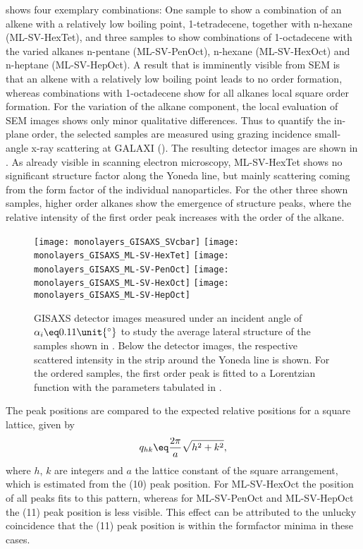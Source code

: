 \documentclass[\main/dresen_thesis.tex]{subfiles}
\begin{document}
   shows four exemplary combinations: One sample to show a combination of an alkene with a relatively low boiling point, 1-tetradecene, together with n-hexane (ML-SV-HexTet), and three samples to show combinations of 1-octadecene with the varied alkanes n-pentane (ML-SV-PenOct), n-hexane (ML-SV-HexOct) and n-heptane (ML-SV-HepOct).
  A result that is imminently visible from SEM is that an alkene with a relatively low boiling point leads to no order formation, whereas  combinations with 1-octadecene show for all alkanes local square order formation.
  For the variation of the alkane component, the local evaluation of SEM images shows only minor qualitative differences.
  Thus to quantify the in-plane order, the selected samples are measured using grazing incidence small-angle x-ray scattering at GALAXI ().
  The resulting detector images are shown in .
  As already visible in scanning electron microscopy, ML-SV-HexTet shows no significant structure factor along the Yoneda line, but mainly scattering coming from the form factor of the individual nanoparticles.
  For the other three shown samples, higher order alkanes show the emergence of structure peaks, where the relative intensity of the first order peak increases with the order of the alkane.

  \begin{figure}[tb]
    \centering
    \texttt{[image: monolayers\_GISAXS\_SVcbar]}
    \texttt{[image: monolayers\_GISAXS\_ML-SV-HexTet]}
    \texttt{[image: monolayers\_GISAXS\_ML-SV-PenOct]}
    \texttt{[image: monolayers\_GISAXS\_ML-SV-HexOct]}
    \texttt{[image: monolayers\_GISAXS\_ML-SV-HepOct]}
    \caption{\label{fig:monolayers:preparation:solventVariation:gisaxs}GISAXS detector images measured under an incident angle of $\alpha_i \eq 0.11 \unit{^\circ}$ to study the average lateral structure of the samples shown in . Below the detector images, the respective scattered intensity in the strip around the Yoneda line is shown. For the ordered samples, the first order peak is fitted to a Lorentzian function with the parameters tabulated in .}
  \end{figure}

  The peak positions are compared to the expected relative positions for a square lattice, given by
  \begin{align}
    q_{hk} \eq \frac{2 \pi}{a} \sqrt{h^2 + k^2},
  \end{align}
  where $h$, $k$ are integers and $a$ the lattice constant of the square arrangement, which is estimated from the (10) peak position.
  For ML-SV-HexOct the position of all peaks fits to this pattern, whereas for ML-SV-PenOct and ML-SV-HepOct the (11) peak position is less visible.
  This effect can be attributed to the unlucky coincidence that the (11) peak position is within the formfactor minima in these cases.
  \FloatBarrier
\end{document}
